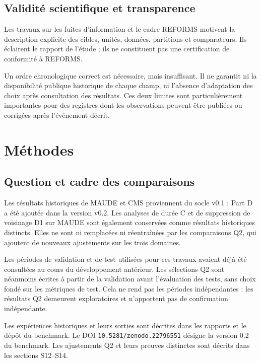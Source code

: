 \subsection{Validité scientifique et transparence}

Les travaux sur les fuites d'information et le cadre REFORMS motivent la description explicite des cibles, unités, données, partitions et comparateurs\cite{kapoor2023leakage,kapoor2024reforms}. Ils éclairent le rapport de l'étude ; ils ne constituent pas une certification de conformité à REFORMS.

Un ordre chronologique correct est nécessaire, mais insuffisant. Il ne garantit ni la disponibilité publique historique de chaque champ, ni l'absence d'adaptation des choix après consultation des résultats. Ces deux limites sont particulièrement importantes pour des registres dont les observations peuvent être publiées ou corrigées après l'événement décrit.


\section{Méthodes}
\label{sec:methods}

\subsection{Question et cadre des comparaisons}

Les résultats historiques de MAUDE et CMS proviennent du socle v0.1 ; Part D a été ajoutée dans la version v0.2. Les analyses de durée C et de suppression de voisinage D1 sur MAUDE sont également conservées comme résultats historiques distincts. Elles ne sont ni remplacées ni réentraînées par les comparaisons Q2, qui ajoutent de nouveaux ajustements sur les trois domaines.

Les périodes de validation et de test utilisées pour ces travaux avaient déjà été consultées au cours du développement antérieur. Les sélections Q2 sont néanmoins écrites à partir de la validation avant l'évaluation des tests, sans choix fondé sur les métriques de test. Cela ne rend pas les périodes indépendantes : les résultats Q2 demeurent exploratoires et n'apportent pas de confirmation indépendante.

Les expériences historiques et leurs sorties sont décrites dans les rapports et le dépôt du benchmark\cite{hgb2026,hgbcontract,hgbresults,hgbpartd,hgbanalysis,hgbcode}. Le DOI \nolinkurl{10.5281/zenodo.22796551} désigne la version 0.2 du benchmark. Les ajustements Q2 et leurs preuves distinctes sont décrits dans les sections S12--S14\cite{hgbq2methods}.


